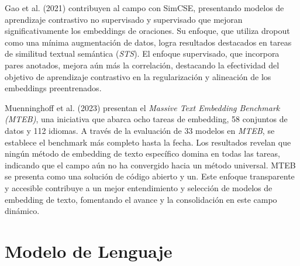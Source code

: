     Gao et al. (2021)\cite{gao2022simcse} contribuyen al campo con SimCSE, presentando modelos de aprendizaje contrastivo no supervisado y supervisado que mejoran significativamente los embeddings de oraciones. Su enfoque, que utiliza dropout como una mínima augmentación de datos, logra resultados destacados en tareas de similitud textual semántica (\emph{STS}). El enfoque supervisado, que incorpora pares anotados, mejora aún más la correlación, destacando la efectividad del objetivo de aprendizaje contrastivo en la regularización y alineación de los embeddings preentrenados.

    Muenninghoff et al. (2023)\cite{muennighoff2023mteb} presentan el \emph{Massive Text Embedding Benchmark (MTEB)}, una iniciativa que abarca ocho tareas de embedding, 58 conjuntos de datos y 112 idiomas. A través de la evaluación de 33 modelos en \emph{MTEB}, se establece el benchmark más completo hasta la fecha. Los resultados revelan que ningún método de embedding de texto específico domina en todas las tareas, indicando que el campo aún no ha convergido hacia un método universal. MTEB se presenta como una solución de código abierto y un\cite[leaderboard público]{leaderboard}. Este enfoque transparente y accesible contribuye a un mejor entendimiento y selección de modelos de embedding de texto, fomentando el avance y la consolidación en este campo dinámico.

\section{Modelo de Lenguaje}